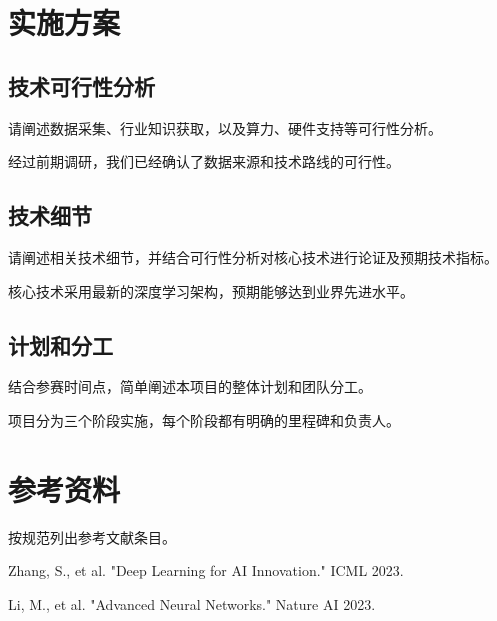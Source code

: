 \documentclass{cpipc}
\begin{document}
\section{实施方案}
\subsection{技术可行性分析}
{\BodyText
\FirstParagraph 请阐述数据采集、行业知识获取，以及算力、硬件支持等可行性分析。

\NextParagraph 经过前期调研，我们已经确认了数据来源和技术路线的可行性。
}

\subsection{技术细节}
{\BodyText
\FirstParagraph 请阐述相关技术细节，并结合可行性分析对核心技术进行论证及预期技术指标。

\NextParagraph 核心技术采用最新的深度学习架构，预期能够达到业界先进水平。
}

\subsection{计划和分工}
{\BodyText
\FirstParagraph 结合参赛时间点，简单阐述本项目的整体计划和团队分工。

\NextParagraph 项目分为三个阶段实施，每个阶段都有明确的里程碑和负责人。
}

\section{参考资料}
{\BodyText
\FirstParagraph 按规范列出参考文献条目。

\NextParagraph [1] Zhang, S., et al. "Deep Learning for AI Innovation." ICML 2023.

\NextParagraph [2] Li, M., et al. "Advanced Neural Networks." Nature AI 2023.
}
\end{document}
